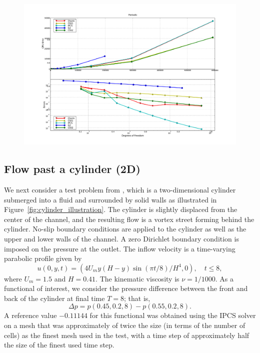\begin{figure}
  {\includegraphics[width=\fullfig]{chapters/kvs-1/pdf/new_periodic_res.pdf}}
\end{figure}

\subsection{Flow past a cylinder (2D)}

We next consider a test problem from \citet{Turek1996}, which is a
two-dimensional cylinder submerged into a fluid and surrounded by
solid walls as illustrated in
Figure~\ref{fig:cylinder_illustration}. The cylinder is slightly
displaced from the center of the channel, and the resulting flow is a
vortex street forming behind the cylinder. No-slip boundary conditions
are applied to the cylinder as well as the upper and lower walls of
the channel. A zero Dirichlet boundary condition is imposed on the
pressure at the outlet. The inflow velocity is a time-varying
parabolic profile given by
\begin{equation} \label{eq:cyl_inflow}
  u(0, y, t) = (4 U_m y (H - y) \sin(\pi t/8)/H^{4}, 0), \quad t \leqslant 8,
\end{equation}
where $U_m = 1.5$ and $H = 0.41$. The kinematic viscosity is $\nu =
1/1000$. As a functional of interest, we consider the pressure
difference between the front and back of the cylinder at final time $T
= 8$; that is,
\begin{equation}\label{eq:dp}
  \Delta p = p(0.45, 0.2, 8) - p(0.55, 0.2, 8).
\end{equation}
A reference value $-0.11144$ for this functional was obtained using
the IPCS solver on a mesh that was approximately of twice the size (in
terms of the number of cells) as the finest mesh used in the test,
with a time step of approximately half the size of the finest used
time step.

